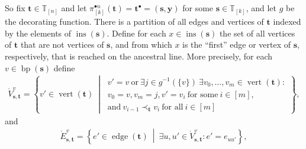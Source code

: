 \documentclass[a4paper, final]{amsart}
\theoremstyle{plain}
\theoremstyle{definition}
\newcommand{\tree}[1][t]{\boldsymbol{#1}}
\newcommand{\T}{\mathbb{T}}
\DeclareMathOperator{\edge}{edge}
\DeclareMathOperator{\vertices}{vert}
\DeclareMathOperator{\insertable}{ins}
\DeclareMathOperator{\branchpoints}{bp}
\newcommand{\insertablef}[1][\tree]{\insertable({\tree[#1]})}
\begin{document}
  So fix $\tree \in \T_{[n]}$ and let $\pi_{[k]}^{\bullet n} ( \tree ) = \tree^\bullet = \left( \tree[s], \mathbf{y} \right)$ for some $\tree[s] \in \T_{[k]}$, and let $g$ be the decorating function.
There is a partition of all edges and vertices of $\tree$ indexed by the elements of $\insertablef[s]$.
Define for each $x \in \insertablef[s]$ the set of all vertices of $\tree$ that are not vertices of $\tree[s]$, and from which $x$ is the “first” edge or vertex of $\tree[s]$, respectively, that is reached on the ancestral line.
More precisely, for each $v \in \branchpoints (\tree[s])$ define
  \begin{align*}
    \mathring{V}_{\tree[s], \tree}^v
    = \left\{ v' \in \vertices (\tree) \ \middle \vert \  
      \begin{matrix}
        v' = v \ \text{or}\ \exists j \in g^{-1}(\{v\})\ \exists v_0, \ldots, v_m \in \vertices (\tree) \colon \\
        v_0 = v, v_m = j, v' = v_i \ \text{for some}\ i \in [m], \\
        \text{and}\ v_{i-1} \prec_{\tree} v_i \ \text{for all}\ i \in [m]
      \end{matrix}
  \right\},
\end{align*}
  and
  \begin{align*}
    \mathring{E}_{\tree[s],\tree}^v
    = \left\{ e' \in \edge(\tree) \ \middle \vert \ \exists u, u' \in \mathring{V}_{\tree[s], \tree}^v \colon e' = e_{uu'} \right\},
  \end{align*}
\end{document}
